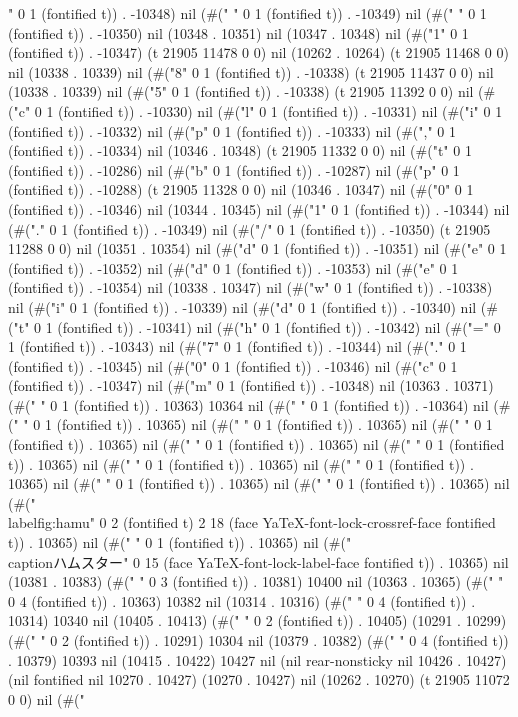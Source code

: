 " 0 1 (fontified t)) . -10348) nil (#("	" 0 1 (fontified t)) . -10349) nil (#("	" 0 1 (fontified t)) . -10350) nil (10348 . 10351) nil (10347 . 10348) nil (#("1" 0 1 (fontified t)) . -10347) (t 21905 11478 0 0) nil (10262 . 10264) (t 21905 11468 0 0) nil (10338 . 10339) nil (#("8" 0 1 (fontified t)) . -10338) (t 21905 11437 0 0) nil (10338 . 10339) nil (#("5" 0 1 (fontified t)) . -10338) (t 21905 11392 0 0) nil (#("c" 0 1 (fontified t)) . -10330) nil (#("l" 0 1 (fontified t)) . -10331) nil (#("i" 0 1 (fontified t)) . -10332) nil (#("p" 0 1 (fontified t)) . -10333) nil (#("," 0 1 (fontified t)) . -10334) nil (10346 . 10348) (t 21905 11332 0 0) nil (#("t" 0 1 (fontified t)) . -10286) nil (#("b" 0 1 (fontified t)) . -10287) nil (#("p" 0 1 (fontified t)) . -10288) (t 21905 11328 0 0) nil (10346 . 10347) nil (#("0" 0 1 (fontified t)) . -10346) nil (10344 . 10345) nil (#("1" 0 1 (fontified t)) . -10344) nil (#("." 0 1 (fontified t)) . -10349) nil (#("/" 0 1 (fontified t)) . -10350) (t 21905 11288 0 0) nil (10351 . 10354) nil (#("d" 0 1 (fontified t)) . -10351) nil (#("e" 0 1 (fontified t)) . -10352) nil (#("d" 0 1 (fontified t)) . -10353) nil (#("e" 0 1 (fontified t)) . -10354) nil (10338 . 10347) nil (#("w" 0 1 (fontified t)) . -10338) nil (#("i" 0 1 (fontified t)) . -10339) nil (#("d" 0 1 (fontified t)) . -10340) nil (#("t" 0 1 (fontified t)) . -10341) nil (#("h" 0 1 (fontified t)) . -10342) nil (#("=" 0 1 (fontified t)) . -10343) nil (#("7" 0 1 (fontified t)) . -10344) nil (#("." 0 1 (fontified t)) . -10345) nil (#("0" 0 1 (fontified t)) . -10346) nil (#("c" 0 1 (fontified t)) . -10347) nil (#("m" 0 1 (fontified t)) . -10348) nil (10363 . 10371) (#("	" 0 1 (fontified t)) . 10363) 10364 nil (#("	" 0 1 (fontified t)) . -10364) nil (#(" " 0 1 (fontified t)) . 10365) nil (#(" " 0 1 (fontified t)) . 10365) nil (#(" " 0 1 (fontified t)) . 10365) nil (#(" " 0 1 (fontified t)) . 10365) nil (#(" " 0 1 (fontified t)) . 10365) nil (#(" " 0 1 (fontified t)) . 10365) nil (#(" " 0 1 (fontified t)) . 10365) nil (#("	" 0 1 (fontified t)) . 10365) nil (#("
" 0 1 (fontified t)) . 10365) nil (#("		\\label{fig:hamu}" 0 2 (fontified t) 2 18 (face YaTeX-font-lock-crossref-face fontified t)) . 10365) nil (#("
" 0 1 (fontified t)) . 10365) nil (#("\\caption{ハムスター}" 0 15 (face YaTeX-font-lock-label-face fontified t)) . 10365) nil (10381 . 10383) (#("   " 0 3 (fontified t)) . 10381) 10400 nil (10363 . 10365) (#("    " 0 4 (fontified t)) . 10363) 10382 nil (10314 . 10316) (#("    " 0 4 (fontified t)) . 10314) 10340 nil (10405 . 10413) (#("  " 0 2 (fontified t)) . 10405) (10291 . 10299) (#("  " 0 2 (fontified t)) . 10291) 10304 nil (10379 . 10382) (#("    " 0 4 (fontified t)) . 10379) 10393 nil (10415 . 10422) 10427 nil (nil rear-nonsticky nil 10426 . 10427) (nil fontified nil 10270 . 10427) (10270 . 10427) nil (10262 . 10270) (t 21905 11072 0 0) nil (#("
